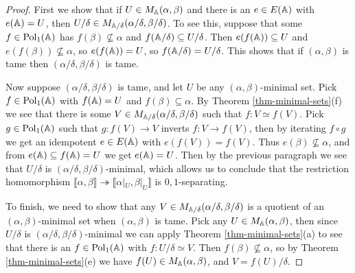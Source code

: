 \begin{appendices}
\begin{proof}
First we show that if $U \in M_{\mathbb{A}}(\alpha,\beta)$ and there is an $e \in E(\mathbb{A})$ with $e(\mathbb{A}) = U$, then $U/\delta \in M_{\mathbb{A}/\delta}(\alpha/\delta,\beta/\delta)$. To see this, suppose that some $f \in \operatorname{Pol}_1(\mathbb{A})$ has $f(\beta) \not\subseteq \alpha$ and $f(\mathbb{A}/\delta) \subseteq U/\delta$. Then $e(f(\mathbb{A})) \subseteq U$ and $e(f(\beta)) \not\subseteq \alpha$, so $e(f(\mathbb{A})) = U$, so $f(\mathbb{A}/\delta) = U/\delta$. This shows that if $(\alpha,\beta)$ is tame then $(\alpha/\delta, \beta/\delta)$ is tame.

Now suppose $(\alpha/\delta, \beta/\delta)$ is tame, and let $U$ be any $(\alpha,\beta)$-minimal set. Pick $f \in \operatorname{Pol}_1(\mathbb{A})$ with $f(\mathbb{A}) = U$ and $f(\beta) \subseteq \alpha$. By Theorem \ref{thm-minimal-sets}(f) we see that there is some $V \in M_{\mathbb{A}/\delta}(\alpha/\delta, \beta/\delta)$ such that $f : V \simeq f(V)$. Pick $g \in \operatorname{Pol}_1(\mathbb{A})$ such that $g : f(V) \rightarrow V$ inverts $f : V \rightarrow f(V)$, then by iterating $f\circ g$ we get an idempotent $e \in E(\mathbb{A})$ with $e(f(V)) = f(V)$. Thus $e(\beta) \not\subseteq \alpha$, and from $e(\mathbb{A}) \subseteq f(\mathbb{A}) = U$ we get $e(\mathbb{A}) = U$. Then by the previous paragraph we see that $U/\delta$ is $(\alpha/\delta,\beta/\delta)$-minimal, which allows us to conclude that the restriction homomorphism $\llbracket \alpha, \beta \rrbracket \twoheadrightarrow \llbracket \alpha|_U, \beta|_U \rrbracket$ is $0,1$-separating.

To finish, we need to show that any $V \in M_{\mathbb{A}/\delta}(\alpha/\delta,\beta/\delta)$ is a quotient of an $(\alpha,\beta)$-minimal set when $(\alpha,\beta)$ is tame. Pick any $U \in M_{\mathbb{A}}(\alpha,\beta)$, then since $U/\delta$ is $(\alpha/\delta,\beta/\delta)$-minimal we can apply Theorem \ref{thm-minimal-sets}(a) to see that there is an $f \in \operatorname{Pol}_1(\mathbb{A})$ with $f : U/\delta \simeq V$. Then $f(\beta) \not\subseteq \alpha$, so by Theorem \ref{thm-minimal-sets}(e) we have $f(U) \in M_{\mathbb{A}}(\alpha,\beta)$, and $V = f(U)/\delta$.
\end{proof}

\begin{comment}
\begin{prop} If $(\alpha,\beta)$ is a tame congruence quotient on a finite algebra $\bA$, and if $C$ is a congruence class of $\beta$ which is not also a congruence class of $\alpha$, then $\bA|_C/\alpha|_C$ is a tame algebra.
\end{prop}
\begin{proof} By Corollary \ref{cor-trace-closure}, there is some $(\alpha,\beta)$-trace $N$ of some $(\alpha,\beta)$-minimal set $U$ such that $N \subseteq C$. By Theorem \ref{thm-minimal-sets}(b), there is some idempotent $e \in E(\bA)$ such that $e(\bA) = U$. Since $e$ preserves $\beta$ and $e(N) = N \subseteq C$, we must have $e(C) \subseteq C$, so $e \in E(\bA|_C)$. We will prove that $N = U \cap C$ is an $(\alpha|_C,1_C)$-minimal set of $\bA|_C$, and that the restriction homomorphism $\llbracket \alpha|_C, 1_C \rrbracket \twoheadrightarrow \llbracket \alpha|_N, 1_N \rrbracket$ is $0,1$-separating - this will allow us to apply the previous proposition.


\end{comment}
\end{appendices}
